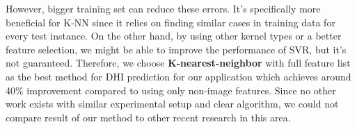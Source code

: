 However, bigger training set can reduce these errors. It's specifically more beneficial for K-NN since it relies on finding similar cases in training data for every test instance. On the other hand, by using other kernel types or a better feature selection, we might be able to improve the performance of SVR, but it's not guaranteed. Therefore, we choose \textbf{K-nearest-neighbor} with full feature list as the best method for DHI prediction for our application which achieves around 40\% improvement compared to using only non-image features. Since no other work exists with similar experimental setup and clear algorithm, we could not compare result of our method to other recent research in this area.